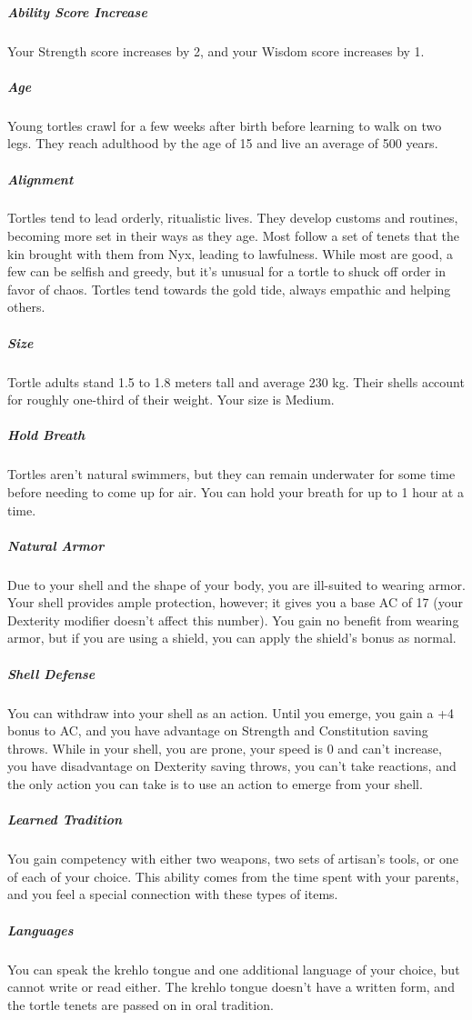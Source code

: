 \subparagraph{Ability Score Increase} Your Strength score increases by 2, and your Wisdom score increases by 1.

\subparagraph{Age} Young tortles crawl for a few weeks after birth before learning to walk on two legs.
They reach adulthood by the age of 15 and live an average of 500 years.

\subparagraph{Alignment} Tortles tend to lead orderly, ritualistic lives.
They develop customs and routines, becoming more set in their ways as they age.
Most follow a set of tenets that the kin brought with them from Nyx, leading to lawfulness.
While most are good, a few can be selfish and greedy, but it's unusual for a tortle to shuck off order in favor of chaos.
Tortles tend towards the gold tide, always empathic and helping others.

\subparagraph{Size} Tortle adults stand 1.5 to 1.8 meters tall and average 230 kg.
Their shells account for roughly one-third of their weight.
Your size is Medium.

\subparagraph{Hold Breath} Tortles aren't natural swimmers, but they can remain underwater for some time before needing to come up for air.
You can hold your breath for up to 1 hour at a time.

\subparagraph{Natural Armor} Due to your shell and the shape of your body, you are ill-suited to wearing armor.
Your shell provides ample protection, however; it gives you a base AC of 17 (your Dexterity modifier doesn't affect this number).
You gain no benefit from wearing armor, but if you are using a shield, you can apply the shield's bonus as normal.

\subparagraph{Shell Defense} You can withdraw into your shell as an action.
Until you emerge, you gain a +4 bonus to AC, and you have advantage on Strength and Constitution saving throws.
While in your shell, you are prone, your speed is 0 and can't increase, you have disadvantage on Dexterity saving throws, you can't take reactions, and the only action you can take is to use an action to emerge from your shell.


\subparagraph{Learned Tradition} You gain competency with either two weapons, two sets of artisan's tools, or one of each of your choice.
This ability comes from the time spent with your parents, and you feel a special connection with these types of items.

\subparagraph{Languages} You can speak the krehlo tongue and one additional language of your choice, but cannot write or read either.
The krehlo tongue doesn't have a written form, and the tortle tenets are passed on in oral tradition.



\newpage

